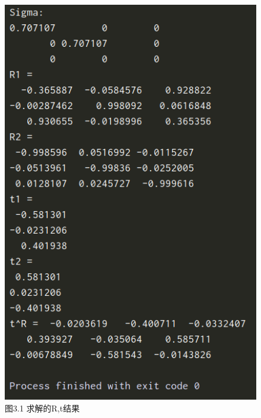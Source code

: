 \documentclass[40pt,a4paper，UTF8]{ctexart}
\numberwithin{equation}{section}
\begin{document}
\begin{figure}[H]
\centering
\includegraphics[scale=0.5]{ch5_3_1.png} {\\图3.1 求解的R,t结果}
\end{figure}
\end{document}
